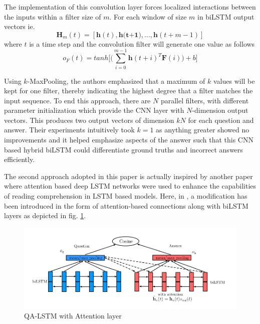 \documentclass[a4paper,12pt]{report}
\begin{document}
            The implementation of this convolution layer forces localized interactions between the inputs within a filter size of $ m $. For each window of size $ m $ in biLSTM output vectors ie.
            \begin{equation}
            \textbf{H}_{m}(t)=[\textbf{h}(t), \textbf{h(t+1)},...,\textbf{h}(t+m-1)]
            \end{equation}
            where $ t $ is a time step and the convolution filter will generate one value as follows
            \begin{equation}
                o_{F}(t) = tanh \bigg[\bigg(\sum_{i=0}^{m-1}\textbf{h}(t+i)^{T}\textbf{F}(i)\bigg)+b\bigg]
            \end{equation}

            Using $ k $-MaxPooling, the authors emphasized that a maximum of $ k $ values will be kept  for one filter, thereby indicating the highest degree that a filter matches the input sequence. To end this approach, there are $ N $ parallel filters, with different parameter initialization which provide the CNN layer with $ N $-dimension output vectors. This produces two output vectors of dimension $ kN $ for each question and answer.  Their experiments intuitively took $k=1$ as anything greater showed no improvements and it helped emphasize aspects of the answer such that this CNN based hybrid biLSTM could differentiate ground truths and incorrect answers efficiently.

            The second approach adopted in this paper is actually inspired by another paper \citep{bilstmherman} where attention based deep LSTM networks were used to enhance the capabilities of reading comprehension in LSTM based models. Here, in \citep{lstmhaighextractive}, a modification has been introduced in the form of attention-based connections along with biLSTM layers as depicted in fig. \ref{lstmhaigattention}.
            \begin{figure}
                \centering
                \includegraphics[scale=0.35]{../images/lstm-bilstmhaighattention.png}
                \caption{QA-LSTM with Attention layer \citep{lstmhaighextractive}}\label{lstmhaigattention}
            \end{figure}
\end{document}
